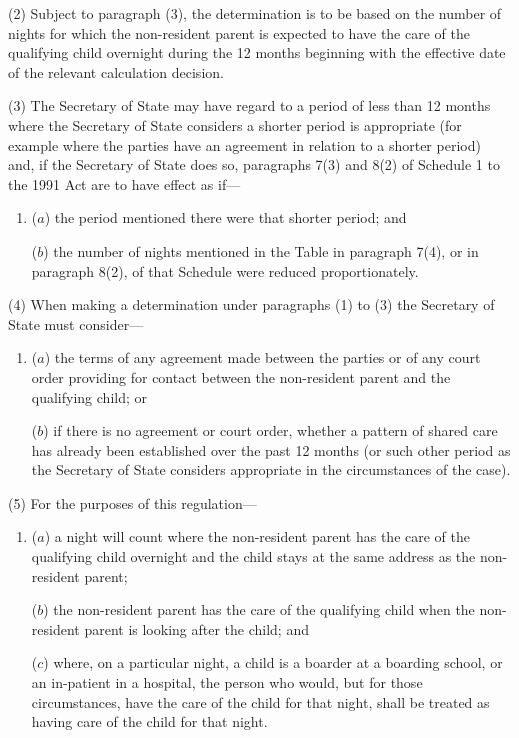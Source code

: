 \documentclass[12pt,a4paper]{article}
\begin{document}
(2) Subject to paragraph (3), the determination is to be based on the number of nights for which the non-resident parent is expected to have the care of the qualifying child overnight during the 12 months beginning with the effective date of the relevant calculation decision.

(3) The Secretary of State may have regard to a period of less than 12 months where the Secretary of State considers a shorter period is appropriate (for example where the parties have an agreement in relation to a shorter period) and, if the Secretary of State does so, paragraphs 7(3) and 8(2) of Schedule 1 to the 1991 Act are to have effect as if—
\begin{enumerate}\item[]
($a$) the period mentioned there were that shorter period; and

($b$) the number of nights mentioned in the Table in paragraph 7(4), or in paragraph 8(2), of that Schedule were reduced proportionately.
\end{enumerate}

(4) When making a determination under paragraphs (1) to (3) the Secretary of State must consider—
\begin{enumerate}\item[]
($a$) the terms of any agreement made between the parties or of any court order providing for contact between the non-resident parent and the qualifying child; or

($b$) if there is no agreement or court order, whether a pattern of shared care has already been established over the past 12 months (or such other period as the Secretary of State considers appropriate in the circumstances of the case).
\end{enumerate}

(5) For the purposes of this regulation—
\begin{enumerate}\item[]
($a$) a night will count where the non-resident parent has the care of the qualifying child overnight and the child stays at the same address as the non-resident parent;

($b$) the non-resident parent has the care of the qualifying child when the non-resident parent is looking after the child; and

($c$) where, on a particular night, a child is a boarder at a boarding school, or an in-patient in a hospital, the person who would, but for those circumstances, have the care of the child for that night, shall be treated as having care of the child for that night.
\end{enumerate}
\end{document}

